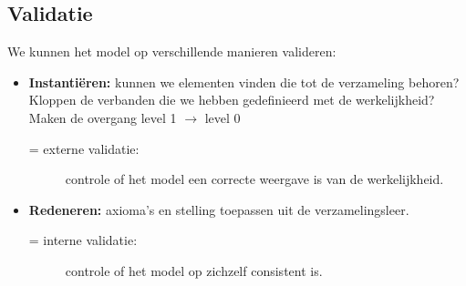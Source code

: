 \documentclass[../main.tex]{subfiles}
\begin{document}
\subsection{Validatie}
We kunnen het model op verschillende manieren valideren:
\begin{itemize}
	\item \textbf{Instanti\"eren:} kunnen we elementen vinden die tot de verzameling behoren? Kloppen de verbanden die we hebben gedefinieerd met de werkelijkheid? Maken de overgang level 1 $\rightarrow$ level 0
	\begin{description}
		\item[= externe validatie:] controle of het model een correcte weergave is van de werkelijkheid.
	\end{description}
	\item \textbf{Redeneren:} axioma's en stelling toepassen uit de verzamelingsleer.
		\begin{description}
		\item[= interne validatie:] controle of het model op zichzelf consistent is.
	\end{description}
\end{itemize}
\end{document}
